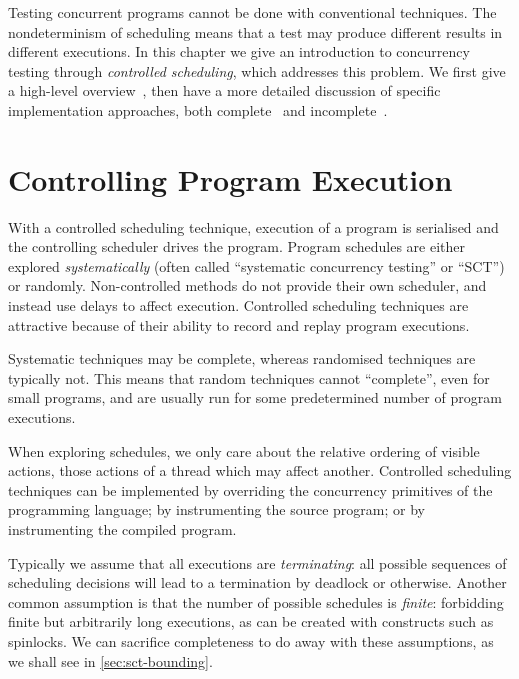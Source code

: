 Testing concurrent programs cannot be done with conventional techniques.  The
nondeterminism of scheduling means that a test may produce different results in
different executions.  In this chapter we give an introduction to concurrency
testing through \emph{controlled scheduling}, which addresses this problem.  We
first give a high-level overview~, then have a more
detailed discussion of specific implementation approaches, both
complete~ and incomplete~.

\section{Controlling Program Execution}
\label{sec:sct-fundamentals}

With a controlled scheduling technique, execution of a program is serialised and
the controlling scheduler drives the program.  Program schedules are either
explored \emph{systematically}\cite{coons2013,musuvathi2008,musuvathi2007,flanagan2005}
(often called ``systematic concurrency testing'' or ``SCT'') or
randomly\cite{thomson2016,burckhardt2010}.  Non-controlled methods do not
provide their own scheduler, and instead use delays to affect
execution\cite{yu2012}.  Controlled scheduling techniques are attractive because
of their ability to record and replay program executions.

Systematic techniques may be complete, whereas randomised techniques are
typically not.  This means that random techniques cannot ``complete'', even for
small programs, and are usually run for some predetermined number of program
executions.

When exploring schedules, we only care about the relative ordering of visible
actions, those actions of a thread which may affect another.  Controlled
scheduling techniques can be implemented by overriding the concurrency
primitives of the programming language\cite{walker2015}; by instrumenting the
source program\cite{claessen2009}; or by instrumenting the compiled
program\cite{yu2012,musuvathi2006}.

Typically we assume that all executions are \emph{terminating}: all possible
sequences of scheduling decisions will lead to a termination by deadlock or
otherwise.  Another common assumption is that the number of possible schedules
is \emph{finite}: forbidding finite but arbitrarily long executions, as can be
created with constructs such as spinlocks.  We can sacrifice completeness to do
away with these assumptions, as we shall see in \cref{sec:sct-bounding}.

